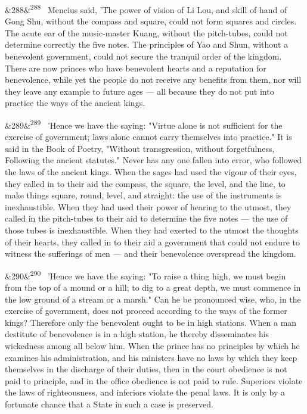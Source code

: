 \documentclass[12pt]{article}
\newcommand{\para}[1][]{\par\noindent\ifx&#1&\else\textsuperscript{\footnotesize #1}~\fi}
\begin{document}
\para[288] Mencius said, 'The power of vision of Li Lou, and skill of hand of Gong Shu, without the compass and square, could not form squares and circles. The acute ear of the music-master Kuang, without the pitch-tubes, could not determine correctly the five notes. The principles of Yao and Shun, without a benevolent government, could not secure the tranquil order of the kingdom. There are now princes who have benevolent hearts and a reputation for benevolence, while yet the people do not receive any benefits from them, nor will they leave any example to future ages --- all because they do not put into practice the ways of the ancient kings.

\para[289] 'Hence we have the saying: "Virtue alone is not sufficient for the exercise of government; laws alone cannot carry themselves into practice." It is said in the Book of Poetry, "Without transgression, without forgetfulness, Following the ancient statutes." Never has any one fallen into error, who followed the laws of the ancient kings. When the sages had used the vigour of their eyes, they called in to their aid the compass, the square, the level, and the line, to make things square, round, level, and straight: the use of the instruments is inexhaustible. When they had used their power of hearing to the utmost, they called in the pitch-tubes to their aid to determine the five notes --- the use of those tubes is inexhaustible. When they had exerted to the utmost the thoughts of their hearts, they called in to their aid a government that could not endure to witness the sufferings of men --- and their benevolence overspread the kingdom.

\para[290] 'Hence we have the saying: "To raise a thing high, we must begin from the top of a mound or a hill; to dig to a great depth, we must commence in the low ground of a stream or a marsh." Can he be pronounced wise, who, in the exercise of government, does not proceed according to the ways of the former kings? Therefore only the benevolent ought to be in high stations. When a man destitute of benevolence is in a high station, he thereby disseminates his wickedness among all below him. When the prince has no principles by which he examines his administration, and his ministers have no laws by which they keep themselves in the discharge of their duties, then in the court obedience is not paid to principle, and in the office obedience is not paid to rule. Superiors violate the laws of righteousness, and inferiors violate the penal laws. It is only by a fortunate chance that a State in such a case is preserved.
\end{document}
